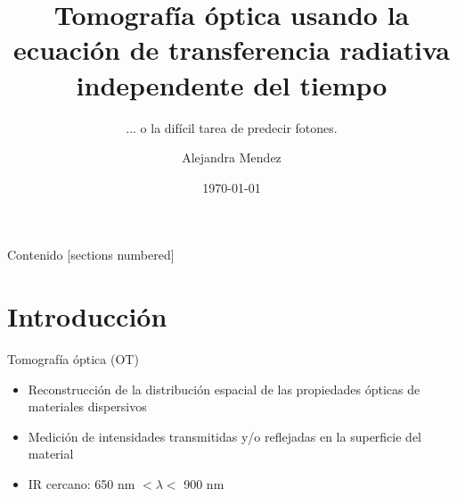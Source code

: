 \documentclass[10pt]{beamer}
\title{Tomograf\'ia \'optica usando la ecuaci\'on de transferencia radiativa 
independente del tiempo}
\subtitle{... o la dif\'icil tarea de predecir fotones.}
\date{\today}
\author{Alejandra Mendez}
\institute{Instituto de Astronom\'ia y F\'isica del Espacio}
\begin{document}
\maketitle

\begin{frame}{Contenido}
  [sections numbered]
  \tableofcontents[hideallsubsections]
\end{frame}
\section{Introducci\'on}
\begin{frame}[fragile]{Tomograf\'ia \'optica (OT)}

\begin{itemize}[<+- | alert@+>]
 \item Reconstrucci\'on de la distribuci\'on espacial de las propiedades
 \'opticas de materiales dispersivos
 \item Medici\'on de intensidades transmitidas y/o reflejadas en la 
 superficie del material
 \item IR cercano: 650 nm $<\lambda<$ 900 nm
 
\end{itemize}

\end{frame}
\end{document}
